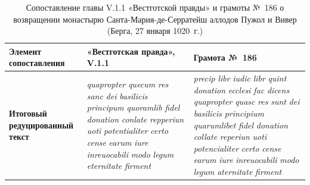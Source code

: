 \begin{center}
\small
\setlength{\tabcolsep}{2pt}
\begin{longtable}{|p{}|p{}|p{}|}
\caption{Сопоставление главы V.1.1 «Вестготской правды» и грамоты №~186 о возвращении монастырю Санта-Мария-де-Серратейш аллодов Пужол и Вивер (Берга, 27 января 1020~г.)}\label{tab:ch1-charter-186}\\
\hline
\textbf{Элемент сопоставления} & \textbf{«Вестготская правда», V.1.1} & \textbf{Грамота}\textbf{ №~186} \\ \hline
\textbf{Итоговый редуцированный текст} & \emph{quapropter}\emph{ }\emph{quecum}\emph{ }\emph{res}\emph{ }\emph{sanc}\emph{ }\emph{dei}\emph{ }\emph{basilicis}\emph{ }\emph{principum}\emph{ }\emph{quoramlib}\emph{ }\emph{fidel}\emph{ }\emph{donation}\emph{ }\emph{conlate}\emph{ }\emph{repperiun}\emph{ }\emph{uoti}\emph{ }\emph{potentialiter}\emph{ }\emph{certo}\emph{ }\emph{cense}\emph{ }\emph{earum}\emph{ }\emph{iure}\emph{ }\emph{inreuocabili}\emph{ }\emph{modo}\emph{ }\emph{legum}\emph{ }\emph{eternitate}\emph{ }\emph{firment} & \emph{precip}\emph{ }\emph{libr}\emph{ }\emph{iudic}\emph{ }\emph{libr}\emph{ }\emph{quint}\emph{ }\emph{donation}\emph{ }\emph{ecclesi}\emph{ }\emph{fac}\emph{ }\emph{dicens}\emph{ }\emph{quapropter}\emph{ }\emph{quasc}\emph{ }\emph{res}\emph{ }\emph{sunt}\emph{ }\emph{dei}\emph{ }\emph{basilicis}\emph{ }\emph{principium}\emph{ }\emph{quarumlibet}\emph{ }\emph{fidel}\emph{ }\emph{donation}\emph{ }\emph{collate}\emph{ }\emph{reperiun}\emph{ }\emph{uoti}\emph{ }\emph{potencialiter}\emph{ }\emph{certo}\emph{ }\emph{cense}\emph{ }\emph{earum}\emph{ }\emph{iure}\emph{ }\emph{inreuocabili}\emph{ }\emph{modo}\emph{ }\emph{legum}\emph{ }\emph{aternitate}\emph{ }\emph{firment} \\ \hline

\end{longtable}
\end{center}
